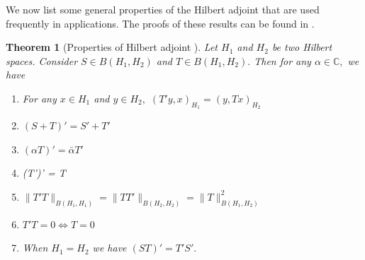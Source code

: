\documentclass[12pt,a4paper]{article}
\theoremstyle{boldthm}
\newtheorem{theorem}{Theorem}[section]
\theoremstyle{bolddefn}
\begin{document}
    

We now list some general properties of the Hilbert adjoint that are used frequently in applications. The proofs of these results can be found in \cite{krey}.  
\begin{theorem}[{Properties of Hilbert adjoint \cite[3.9-4]{krey}}] 
    Let $H_1$ and $H_2$ be two Hilbert spaces. Consider $S \in B(H_1, H_2)$ and $T \in B(H_1, H_2).$ Then for any $\alpha \in \mathbb{C},$ we have 
\begin{enumerate}[label=(\alph*)]
    \item For any $x \in H_1$ and $y \in H_2,$ $(T'y, x)_{H_1} = (y, Tx)_{H_2}$
    \item $(S + T)' = S' + T'$
    \item $(\alpha T)' = \bar{\alpha} T'$
    \item (T')' = T 
    \item $\| T' T \|_{B(H_1, H_1)} = \| T T' \|_{B(H_2, H_2)} = \| T \|_{B(H_1, H_2)}^2 $
    \item $T'T = 0 \iff T = 0$
    \item When $H_1 = H_2$ we have $(ST)' = T'S'.$
\end{enumerate}
\end{theorem}
\end{document}

